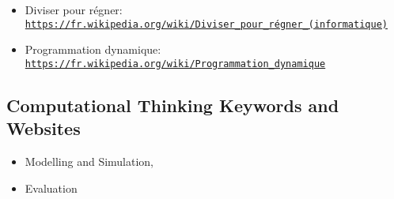 \documentclass[a4paper,11pt]{report}
\newcommand{\BrochureUrlText}[1]{\texttt{#1}}
\begin{document}
\begin{itemize}
  \item Diviser pour régner: \href{https://fr.wikipedia.org/wiki/Diviser_pour_r\%C3\%A9gner_(informatique)}{\BrochureUrlText{https://fr.wikipedia.org/wiki/Diviser\_pour\_régner\_(informatique)}}
  \item Programmation dynamique: \href{https://fr.wikipedia.org/wiki/Programmation_dynamique}{\BrochureUrlText{https://fr.wikipedia.org/wiki/Programmation\_dynamique}}
\end{itemize}


\subsection*{Computational Thinking Keywords and Websites}

\begin{itemize}
  \item Modelling and Simulation,
  \item Evaluation
\end{itemize}
\end{document}
